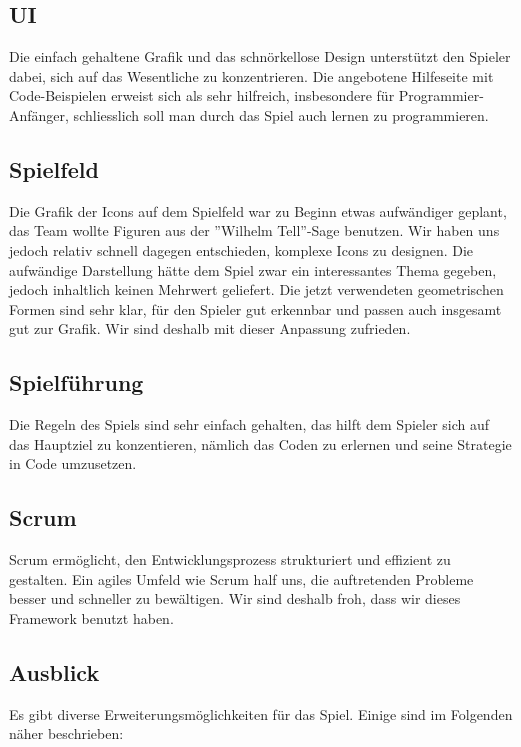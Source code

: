 \documentclass[11pt,a4paper,titlepage]{article}
\begin{document}
\subsection{UI}

Die einfach gehaltene Grafik und das schnörkellose Design unterstützt den Spieler dabei, sich auf das Wesentliche zu konzentrieren.
Die angebotene Hilfeseite mit Code-Beispielen erweist sich als sehr hilfreich, insbesondere für Programmier-Anfänger, schliesslich soll man durch das Spiel auch lernen zu programmieren.

\subsection{Spielfeld}

Die Grafik der Icons auf dem Spielfeld war zu Beginn etwas aufwändiger geplant, das Team wollte Figuren aus der ''Wilhelm Tell''-Sage benutzen. Wir haben uns jedoch relativ schnell dagegen entschieden, komplexe Icons zu designen. Die aufwändige Darstellung hätte dem Spiel zwar ein interessantes Thema gegeben, jedoch inhaltlich keinen Mehrwert geliefert. Die jetzt verwendeten geometrischen Formen sind sehr klar, für den Spieler gut erkennbar und passen auch insgesamt gut zur Grafik. Wir sind deshalb mit dieser Anpassung zufrieden.

\subsection{Spielführung}

Die Regeln des Spiels sind sehr einfach gehalten, das hilft dem Spieler sich auf das Hauptziel zu konzentieren, nämlich das Coden zu erlernen und seine Strategie in Code umzusetzen.

\subsection{Scrum}
Scrum ermöglicht, den Entwicklungsprozess strukturiert und effizient zu gestalten. Ein agiles Umfeld wie Scrum half uns, die auftretenden Probleme besser und schneller zu bewältigen. Wir sind deshalb froh, dass wir dieses Framework benutzt haben.

\subsection{Ausblick}

Es gibt diverse Erweiterungsmöglichkeiten für das Spiel. Einige sind im Folgenden näher beschrieben:
\end{document}
